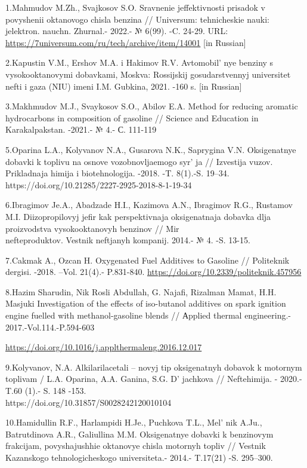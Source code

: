 \begin{references}
1.Mahmudov M.Zh., Svajkosov S.O. Sravnenie jeffektivnosti prisadok v
povyshenii oktanovogo chisla benzina // Universum: tehnicheskie nauki:
jelektron. nauchn. Zhurnal.- 2022.- № 6(99). -C. 24-29. URL:
\url{https://7universum.com/ru/tech/archive/item/14001} {[}in Russian{]}

2.Kapustin V.M., Ershov M.A. i Hakimov R.V.
Avtomobil' nye benziny s vysokooktanovymi dobavkami,
Moskva: Rossijskij gosudarstvennyj universitet nefti i gaza (NIU) imeni
I.M. Gubkina, 2021. -160 s. {[}in Russian{]}

3.Makhmudov M.J., Svaykosov S.O., Abilov E.A. Method for reducing
aromatic hydrocarbons in composition of gasoline // Science and
Education in Karakalpakstan. -2021.- № 4.- С. 111-119

5.Oparina L.A., Kolyvanov N.A., Gusarova N.K., Saprygina V.N.
Oksigenatnye dobavki k toplivu na osnove vozobnovljaemogo
syr' ja // Izvestija vuzov. Prikladnaja himija i
biotehnologija. -2018. -T. 8(1).-S. 19--34.
https://doi.org/10.21285/2227-2925-2018-8-1-19-34

6.Ibragimov Je.A., Abadzade H.I., Kazimova A.N., Ibragimov R.G.,
Rustamov M.I. Diizopropilovyj jefir kak perspektivnaja oksigenatnaja
dobavka dlja proizvodstva vysokooktanovyh benzinov // Mir
\\nefteproduktov. Vestnik neftjanyh kompanij. 2014.- № 4. -S. 13-15.

7.Cakmak A., Ozcan H. Oxygenated Fuel Additives to Gasoline //
Politeknik dergisi. -2018. --Vol. 21(4).- P.831-840.
\url{https://doi.org/10.2339/politeknik.457956}

8.Hazim Sharudin, Nik Rosli Abdullah, G. Najafi, Rizalman Mamat, H.H.
Masjuki Investigation of the effects of iso-butanol additives on spark
ignition engine fuelled with methanol-gasoline blends // Аpplied thermal
engineering.- 2017.-Vol.114.-P.594-603

\url{https://doi.org/10.1016/j.applthermaleng.2016.12.017}

9.Kolyvanov, N.A. Alkilarilacetali -- novyj tip oksigenatnyh dobavok k
motornym toplivam / L.A. Oparina, A.A. Ganina, S.G.
D' jachkova // Neftehimija. - 2020.- T.60 (1).- S. 148
-153. \\https://doi.org/10.31857/S0028242120010104

10.Hamidullin R.F., Harlampidi H.Je., Puchkova T.L.,
Mel' nik A.Ju., Batrutdinova A.R., Galiullina M.M.
Oksigenatnye dobavki k benzinovym frakcijam, povyshajushhie oktanovye
chisla motornyh topliv // Vestnik Kazanskogo tehnologicheskogo
universiteta.- 2014.- T.17(21) -S. 295--300.


\end{references}
